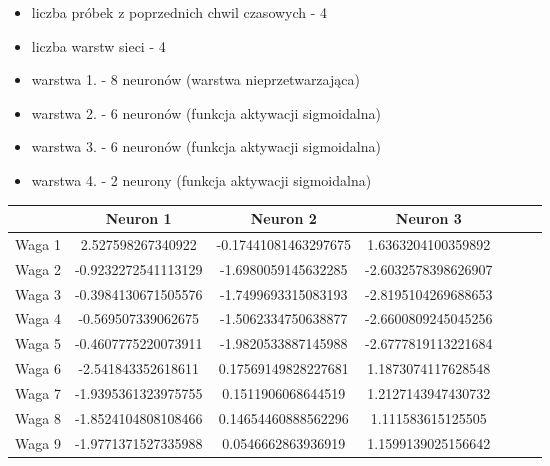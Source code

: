 \documentclass{classrep}
\begin{document}
{        \begin{itemize}
            \item liczba próbek z poprzednich chwil czasowych - 4
            \item liczba warstw sieci - 4
            \item warstwa 1. - 8 neuronów (warstwa nieprzetwarzająca)
            \item warstwa 2. - 6 neuronów (funkcja aktywacji sigmoidalna)
            \item warstwa 3. - 6 neuronów (funkcja aktywacji sigmoidalna)
            \item warstwa 4. - 2 neurony (funkcja aktywacji sigmoidalna)
        \end{itemize}

        \begin{table}[!htbp]
            \centering
            \begin{tabular}{|c|c|c|c|c|c|l|}
            \hline
            & Neuron 1      & Neuron 2      & Neuron 3       \\ \hline
     Waga 1 & 2.527598267340922              &  -0.17441081463297675             &  1.6363204100359892              \\ \hline
     Waga 2 & -0.9232272541113129              & -1.6980059145632285              & -2.6032578398626907               \\ \hline
     Waga 3 & -0.3984130671505576              & -1.7499693315083193              & -2.8195104269688653               \\ \hline
     Waga 4 & -0.569507339062675              &  -1.5062334750638877             &  -2.6600809245045256              \\ \hline
     Waga 5 & -0.4607775220073911              & -1.9820533887145988              &  -2.6777819113221684              \\ \hline
     Waga 6 & -2.541843352618611              & 0.17569149828227681              & 1.1873074117628548               \\ \hline
     Waga 7 & -1.9395361323975755              & 0.1511906068644519              &  1.2127143947430732              \\ \hline
     Waga 8 & -1.8524104808108466              & 0.14654460888562296              &  1.111583615125505              \\ \hline
     Waga 9 & -1.9771371527335988              & 0.0546662863936919              &  1.1599139025156642              \\ \hline


\end{tabular}
\end{table}}
\end{document}
